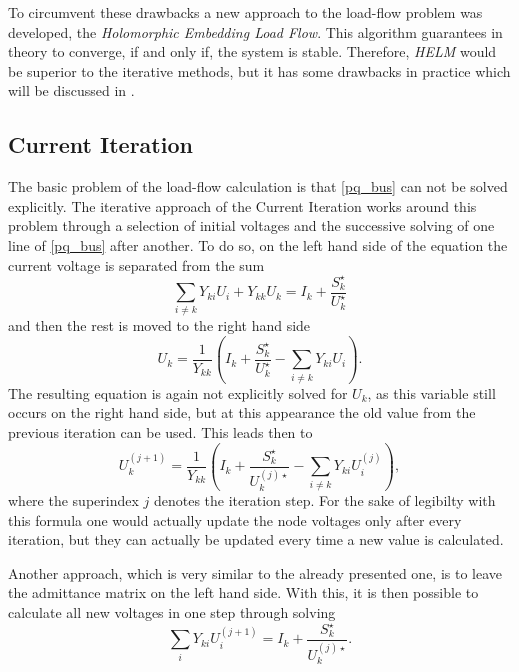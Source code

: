 To circumvent these drawbacks a new approach to the load-flow problem was developed, the \emph{Holomorphic Embedding Load Flow}. This algorithm guarantees in theory to converge, if and only if, the system is stable. Therefore, \emph{HELM} would be superior to the iterative methods, but it has some drawbacks in practice which will be discussed in . 

\subsection{Current Iteration}
\label{sec:current_iteration}

The basic problem of the load-flow calculation is that \eqref{pq_bus} can not be solved explicitly. The iterative approach of the Current Iteration works around this problem through a selection of initial voltages and the successive solving of one line of \eqref{pq_bus} after another. To do so, on the left hand side of the equation the current voltage is separated from the sum
\begin{equation}
	\sum_{i \ne k} Y_{ki} U_i + Y_{kk} U_k = I_k + \frac{S_k^\star}{U_k^\star}
\end{equation}
and then the rest is moved to the right hand side
\begin{equation}
	 U_k = \frac{1}{Y_{kk}} \left( I_k + \frac{S_k^\star}{U_k^\star} - \sum_{i \ne k} Y_{ki} U_i \right).
\end{equation}
The resulting equation is again not explicitly solved for $U_k$, as this variable still occurs on the right hand side, but at this appearance the old value from the previous iteration can be used. This leads then to
\begin{equation}
	 U_k^{(j + 1)} = \frac{1}{Y_{kk}} \left( I_k + \frac{S_k^\star}{U_k^{(j) \star}} - \sum_{i \ne k} Y_{ki} U_i^{(j)} \right),
\end{equation}
where the superindex $j$ denotes the iteration step. For the sake of legibilty with this formula one would actually update the node voltages only after every iteration, but they can actually be updated every time a new value is calculated.

Another approach, which is very similar to the already presented one, is to leave the admittance matrix on the left hand side. With this, it is then possible to calculate all new voltages in one step through solving
\begin{equation}
	\sum_i Y_{ki} U_i^{(j + 1)} = I_k + \frac{S_k^\star}{U_k^{(j)\star}}.
\end{equation}

